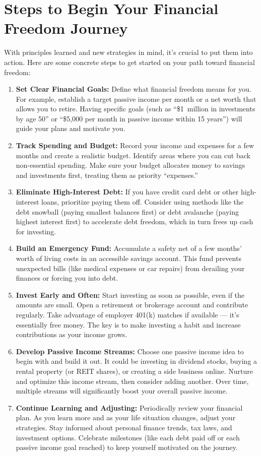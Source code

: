 \documentclass[12pt]{article}
\begin{document}
\section{Steps to Begin Your Financial Freedom Journey}
With principles learned and new strategies in mind, it's crucial to put them into action. Here are some concrete steps to get started on your path toward financial freedom:
\begin{enumerate}
    \item \textbf{Set Clear Financial Goals:} Define what financial freedom means for you. For example, establish a target passive income per month or a net worth that allows you to retire. Having specific goals (such as ``\$1~million in investments by age 50'' or ``\$5,000 per month in passive income within 15 years'') will guide your plans and motivate you.
    \item \textbf{Track Spending and Budget:} Record your income and expenses for a few months and create a realistic budget. Identify areas where you can cut back non-essential spending. Make sure your budget allocates money to savings and investments first, treating them as priority ``expenses.''
    \item \textbf{Eliminate High-Interest Debt:} If you have credit card debt or other high-interest loans, prioritize paying them off. Consider using methods like the debt snowball (paying smallest balances first) or debt avalanche (paying highest interest first) to accelerate debt freedom, which in turn frees up cash for investing.
    \item \textbf{Build an Emergency Fund:} Accumulate a safety net of a few months' worth of living costs in an accessible savings account. This fund prevents unexpected bills (like medical expenses or car repairs) from derailing your finances or forcing you into debt.
    \item \textbf{Invest Early and Often:} Start investing as soon as possible, even if the amounts are small. Open a retirement or brokerage account and contribute regularly. Take advantage of employer 401(k) matches if available --- it's essentially free money. The key is to make investing a habit and increase contributions as your income grows.
    \item \textbf{Develop Passive Income Streams:} Choose one passive income idea to begin with and build it out. It could be investing in dividend stocks, buying a rental property (or REIT shares), or creating a side business online. Nurture and optimize this income stream, then consider adding another. Over time, multiple streams will significantly boost your overall passive income.
    \item \textbf{Continue Learning and Adjusting:} Periodically review your financial plan. As you learn more and as your life situation changes, adjust your strategies. Stay informed about personal finance trends, tax laws, and investment options. Celebrate milestones (like each debt paid off or each passive income goal reached) to keep yourself motivated on the journey.
\end{enumerate}
\end{document}
